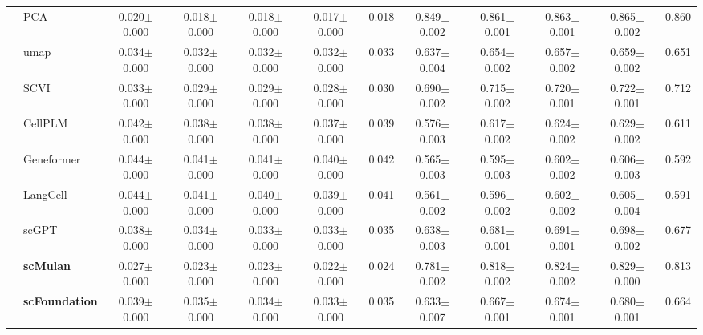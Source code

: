 \begin{table}[htbp]
\begin{tabular}{cl|ccccc|ccccc}
    & PCA      & \cellcolor{gray!25}0.020$\pm$0.000 & \cellcolor{gray!25}0.018$\pm$0.000 & \cellcolor{gray!25}0.018$\pm$0.000 & \cellcolor{gray!25}0.017$\pm$0.000 & \cellcolor{gray!25}0.018      & \cellcolor{gray!25}0.849$\pm$0.002 & \cellcolor{gray!25}0.861$\pm$0.001 & \cellcolor{gray!25}0.863$\pm$0.001 & \cellcolor{gray!25}0.865$\pm$0.002 & \cellcolor{gray!25}0.860 \\
    & umap      & 0.034$\pm$0.000 & 0.032$\pm$0.000 & 0.032$\pm$0.000 & 0.032$\pm$0.000 & 0.033      & 0.637$\pm$0.004 & 0.654$\pm$0.002 & 0.657$\pm$0.002 & 0.659$\pm$0.002 & 0.651 \\
    & SCVI      & 0.033$\pm$0.000 & 0.029$\pm$0.000 & 0.029$\pm$0.000 & 0.028$\pm$0.000 & 0.030      & 0.690$\pm$0.002 & 0.715$\pm$0.002 & 0.720$\pm$0.001 & 0.722$\pm$0.001 & 0.712 \\
    & CellPLM      & 0.042$\pm$0.000 & 0.038$\pm$0.000 & 0.038$\pm$0.000 & 0.037$\pm$0.000 & 0.039      & 0.576$\pm$0.003 & 0.617$\pm$0.002 & 0.624$\pm$0.002 & 0.629$\pm$0.002 & 0.611 \\
    & Geneformer      & 0.044$\pm$0.000 & 0.041$\pm$0.000 & 0.041$\pm$0.000 & 0.040$\pm$0.000 & 0.042      & 0.565$\pm$0.003 & 0.595$\pm$0.003 & 0.602$\pm$0.002 & 0.606$\pm$0.003 & 0.592 \\
    & LangCell      & 0.044$\pm$0.000 & 0.041$\pm$0.000 & 0.040$\pm$0.000 & 0.039$\pm$0.000 & 0.041      & 0.561$\pm$0.002 & 0.596$\pm$0.002 & 0.602$\pm$0.002 & 0.605$\pm$0.004 & 0.591 \\
    & scGPT      & 0.038$\pm$0.000 & 0.034$\pm$0.000 & 0.033$\pm$0.000 & 0.033$\pm$0.000 & 0.035      & 0.638$\pm$0.003 & 0.681$\pm$0.001 & 0.691$\pm$0.001 & 0.698$\pm$0.002 & 0.677 \\
    & \cellcolor{gray!25}\textbf{scMulan}      & 0.027$\pm$0.000 & 0.023$\pm$0.000 & 0.023$\pm$0.000 & 0.022$\pm$0.000 & 0.024      & 0.781$\pm$0.002 & 0.818$\pm$0.002 & 0.824$\pm$0.002 & 0.829$\pm$0.000 & 0.813 \\
    & \cellcolor{gray!25}\textbf{scFoundation}      & 0.039$\pm$0.000 & 0.035$\pm$0.000 & 0.034$\pm$0.000 & 0.033$\pm$0.000 & 0.035      & 0.633$\pm$0.007 & 0.667$\pm$0.001 & 0.674$\pm$0.001 & 0.680$\pm$0.001 & 0.664 \\
    \midrule

    \bottomrule
  \end{tabular}
\end{table}